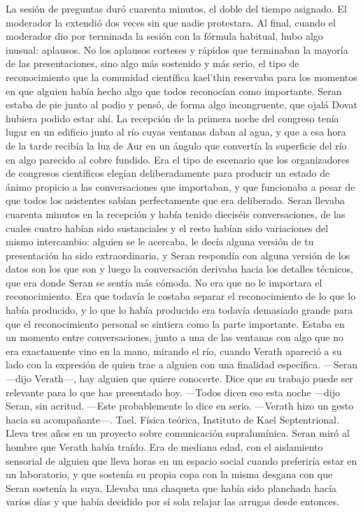 \documentclass[11pt,a5paper,twoside]{book}
\begin{document}
La sesión de preguntas duró cuarenta minutos, el doble del tiempo asignado. El moderador la extendió dos veces sin que nadie protestara.
Al final, cuando el moderador dio por terminada la sesión con la fórmula habitual, hubo algo inusual: aplausos. No los aplausos corteses y rápidos que terminaban la mayoría de las presentaciones, sino algo más sostenido y más serio, el tipo de reconocimiento que la comunidad científica kael'thin reservaba para los momentos en que alguien había hecho algo que todos reconocían como importante.
Seran estaba de pie junto al podio y pensó, de forma algo incongruente, que ojalá Dovat hubiera podido estar ahí.
La recepción de la primera noche del congreso tenía lugar en un edificio junto al río cuyas ventanas daban al agua, y que a esa hora de la tarde recibía la luz de Aur en un ángulo que convertía la superficie del río en algo parecido al cobre fundido. Era el tipo de escenario que los organizadores de congresos científicos elegían deliberadamente para producir un estado de ánimo propicio a las conversaciones que importaban, y que funcionaba a pesar de que todos los asistentes sabían perfectamente que era deliberado.
Seran llevaba cuarenta minutos en la recepción y había tenido dieciséis conversaciones, de las cuales cuatro habían sido sustanciales y el resto habían sido variaciones del mismo intercambio: alguien se le acercaba, le decía alguna versión de tu presentación ha sido extraordinaria, y Seran respondía con alguna versión de los datos son los que son y luego la conversación derivaba hacia los detalles técnicos, que era donde Seran se sentía más cómoda.
No era que no le importara el reconocimiento. Era que todavía le costaba separar el reconocimiento de lo que lo había producido, y lo que lo había producido era todavía demasiado grande para que el reconocimiento personal se sintiera como la parte importante.
Estaba en un momento entre conversaciones, junto a una de las ventanas con algo que no era exactamente vino en la mano, mirando el río, cuando Verath apareció a su lado con la expresión de quien trae a alguien con una finalidad específica.
—Seran —dijo Verath—, hay alguien que quiere conocerte. Dice que su trabajo puede ser relevante para lo que has presentado hoy.
—Todos dicen eso esta noche —dijo Seran, sin acritud.
—Este probablemente lo dice en serio. —Verath hizo un gesto hacia su acompañante—. Tael. Física teórica, Instituto de Kael Septentrional. Lleva tres años en un proyecto sobre comunicación supralumínica.
Seran miró al hombre que Verath había traído. Era de mediana edad, con el aislamiento sensorial de alguien que lleva horas en un espacio social cuando preferiría estar en un laboratorio, y que sostenía su propia copa con la misma desgana con que Seran sostenía la suya. Llevaba una chaqueta que había sido planchada hacía varios días y que había decidido por sí sola relajar las arrugas desde entonces.
\end{document}
